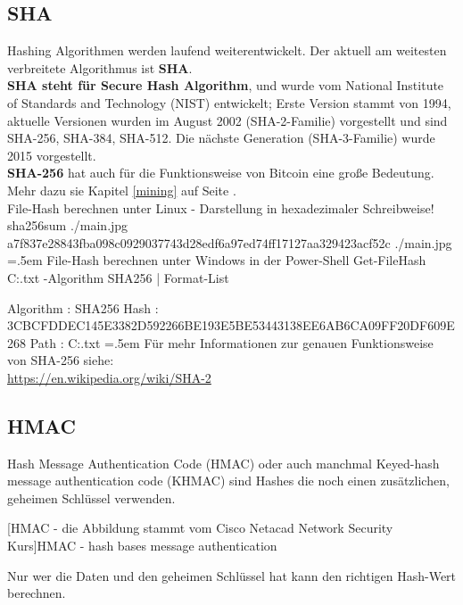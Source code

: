 \documentclass[10pt,a4paper,titlepage]{paper}
\newenvironment{cverbatim}
 {\SaveVerbatim{cverb}}
 {\endSaveVerbatim
  \flushleft\fboxrule=0pt\fboxsep=.5em
  \colorbox{cverbbg}{\BUseVerbatim{cverb}}%
  \endflushleft
}
\begin{document}
\subsection{SHA}
Hashing Algorithmen werden laufend weiterentwickelt. Der aktuell am weitesten verbreitete Algorithmus ist \textbf{SHA}.\\ \textbf{SHA steht für  Secure Hash Algorithm}, und wurde vom National Institute of Standards and Technology (NIST) entwickelt; Erste Version stammt von 1994, aktuelle Versionen wurden im August 2002 (SHA-2-Familie) vorgestellt und sind SHA-256, SHA-384, SHA-512. Die nächste Generation (SHA-3-Familie) wurde 2015 vorgestellt.\vspace{.3cm}\\
\textbf{SHA-256} hat auch für die Funktionsweise von Bitcoin eine große Bedeutung. Mehr dazu sie Kapitel \ref{mining} auf Seite \pageref{mining}.
\vspace{.5cm}\\
File-Hash berechnen unter Linux - Darstellung in hexadezimaler Schreibweise!
\begin{cverbatim}
sha256sum ./main.jpg 
a7f837e28843fba098c0929037743d28edf6a97ed74ff17127aa329423acf52c  ./main.jpg
\end{cverbatim}
File-Hash berechnen unter Windows in der Power-Shell
\begin{cverbatim}
Get-FileHash C:\Users{}\Downloads\file.txt -Algorithm SHA256 | Format-List

Algorithm : SHA256
Hash      : 3CBCFDDEC145E3382D592266BE193E5BE53443138EE6AB6CA09FF20DF609E268
Path      : C:\Users{}\Downloads\file.txt
\end{cverbatim}
Für mehr Informationen zur genauen Funktionsweise von SHA-256 siehe:\\
\href{https://en.wikipedia.org/wiki/SHA-2}{\color{blue}https://en.wikipedia.org/wiki/SHA-2}

\newpage
\subsection{HMAC} \label{hmac}
Hash Message Authentication Code (HMAC) oder auch manchmal Keyed-hash message authentication code (KHMAC) sind Hashes die noch einen zusätzlichen, geheimen Schlüssel verwenden. 
\begin{center}
[HMAC - die Abbildung stammt vom Cisco Netacad Network Security Kurs]{HMAC - hash bases message authentication}
\end{center}
Nur wer die Daten und den geheimen Schlüssel hat kann den richtigen Hash-Wert berechnen.
\end{document}
